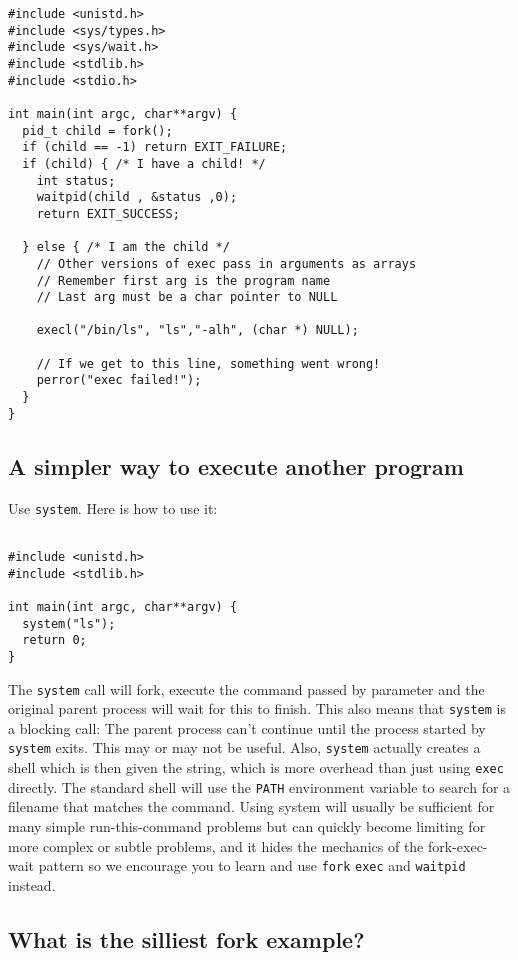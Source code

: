 \begin{verbatim}
#include <unistd.h>
#include <sys/types.h> 
#include <sys/wait.h>
#include <stdlib.h>
#include <stdio.h>

int main(int argc, char**argv) {
  pid_t child = fork();
  if (child == -1) return EXIT_FAILURE;
  if (child) { /* I have a child! */
    int status;
    waitpid(child , &status ,0);
    return EXIT_SUCCESS;

  } else { /* I am the child */
    // Other versions of exec pass in arguments as arrays
    // Remember first arg is the program name
    // Last arg must be a char pointer to NULL

    execl("/bin/ls", "ls","-alh", (char *) NULL);

    // If we get to this line, something went wrong!
    perror("exec failed!");
  }
}
\end{verbatim}

\subsection{A simpler way to execute another
program}\label{a-simpler-way-to-execute-another-program}

Use \texttt{system}. Here is how to use it:

\begin{verbatim}

#include <unistd.h>
#include <stdlib.h>

int main(int argc, char**argv) {
  system("ls");
  return 0;
}
\end{verbatim}

The \texttt{system} call will fork, execute the command passed by
parameter and the original parent process will wait for this to finish.
This also means that \texttt{system} is a blocking call: The parent
process can't continue until the process started by \texttt{system}
exits. This may or may not be useful. Also, \texttt{system} actually
creates a shell which is then given the string, which is more overhead
than just using \texttt{exec} directly. The standard shell will use the
\texttt{PATH} environment variable to search for a filename that matches
the command. Using system will usually be sufficient for many simple
run-this-command problems but can quickly become limiting for more
complex or subtle problems, and it hides the mechanics of the
fork-exec-wait pattern so we encourage you to learn and use
\texttt{fork} \texttt{exec} and \texttt{waitpid} instead.

\subsection{What is the silliest fork
example?}\label{what-is-the-silliest-fork-example}

